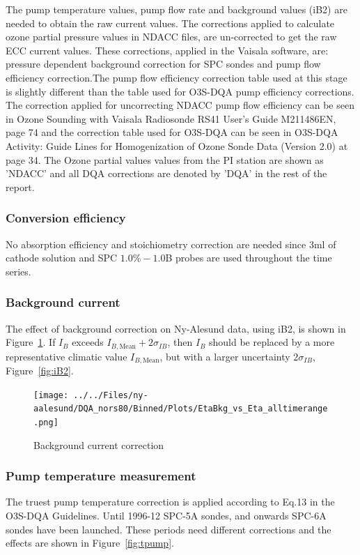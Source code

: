 \documentclass{article}
\begin{document}
The pump temperature values, pump flow rate and background values (iB2) are needed
to obtain the raw current values.
The corrections applied to calculate ozone partial pressure values in NDACC files, are un-corrected to
get the raw ECC current values. These corrections, applied in the Vaisala software, are:
pressure dependent background correction for SPC sondes and pump flow
efficiency correction.The pump flow efficiency correction table used at this stage is slightly different than
the table used for O3S-DQA pump efficiency corrections.
The correction applied for uncorrecting NDACC pump flow efficiency can be seen in Ozone Sounding with Vaisala
Radiosonde RS41 User's Guide M211486EN, page 74 and the correction table
used for O3S-DQA can be seen in O3S-DQA Activity: Guide Lines for Homogenization of Ozone Sonde Data (Version 2.0)
at page 34.
The Ozone partial values values from the PI station are shown as
'NDACC' and all DQA corrections are denoted by 'DQA'
in the rest of the report.

%
\subsubsection{Conversion efficiency}
No absorption efficiency and stoichiometry correction are needed since 3ml of cathode solution and SPC
$1.0\%-1.0$B probes are used throughout the time series.
%

\subsubsection{Background current}
The effect of background correction on Ny-Alesund data, using iB2, is shown in Figure~\ref{fig:bkg}.
    If $I_B$ exceeds $I_{B,\text{Mean}}+2\sigma_{IB}$, then $I_B$
    should be replaced by a more representative climatic value $I_{B,\text{Mean}}$, but with a
    larger uncertainty $2\sigma_{IB}$, Figure~\ref{fig:iB2}.


\begin{figure}
\centering
\texttt{[image: ../../Files/ny-aalesund/DQA\_nors80/Binned/Plots/EtaBkg\_vs\_Eta\_alltimerange.png]}
\caption{Background current correction}
\label{fig:bkg}
\end{figure}
\subsubsection{Pump temperature measurement}

The truest pump temperature correction is applied according to Eq.13 in the O3S-DQA Guidelines.
Until 1996-12 SPC-5A sondes, and onwards  SPC-6A sondes have been launched.
These periods need different corrections and the effects are shown in Figure~\ref{fig:tpump}.
\end{document}
